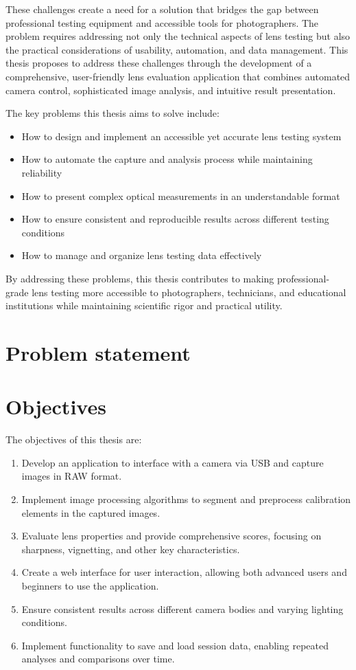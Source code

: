 These challenges create a need for a solution that bridges the gap between professional testing equipment and accessible tools for photographers. The problem requires addressing not only the technical aspects of lens testing but also the practical considerations of usability, automation, and data management. This thesis proposes to address these challenges through the development of a comprehensive, user-friendly lens evaluation application that combines automated camera control, sophisticated image analysis, and intuitive result presentation.

The key problems this thesis aims to solve include:
\begin{itemize}
    \item How to design and implement an accessible yet accurate lens testing system
    \item How to automate the capture and analysis process while maintaining reliability
    \item How to present complex optical measurements in an understandable format
    \item How to ensure consistent and reproducible results across different testing conditions
    \item How to manage and organize lens testing data effectively
\end{itemize}

By addressing these problems, this thesis contributes to making professional-grade lens testing more accessible to photographers, technicians, and educational institutions while maintaining scientific rigor and practical utility.

\section*{Problem statement}
\section*{Objectives}
The objectives of this thesis are:
\begin{enumerate}
    \item Develop an application to interface with a camera via USB and capture images in RAW format.
    \item Implement image processing algorithms to segment and preprocess calibration elements in the captured images.
    \item Evaluate lens properties and provide comprehensive scores, focusing on sharpness, vignetting, and other key characteristics.
    \item Create a web interface for user interaction, allowing both advanced users and beginners to use the application.
    \item Ensure consistent results across different camera bodies and varying lighting conditions.
    \item Implement functionality to save and load session data, enabling repeated analyses and comparisons over time.
\end{enumerate}

